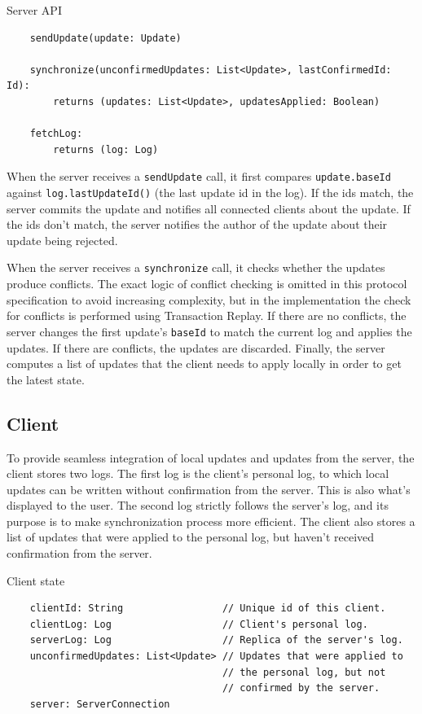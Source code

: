 \documentclass[a4paper, 11pt, oneside]{article}
\theoremstyle{definition}
\begin{document}
\begin{algorithm}
    \caption{Server API}\label{alg:server-api}
    \begin{verbatim}
    sendUpdate(update: Update)

    synchronize(unconfirmedUpdates: List<Update>, lastConfirmedId: Id): 
        returns (updates: List<Update>, updatesApplied: Boolean)

    fetchLog:
        returns (log: Log)
    \end{verbatim}
\end{algorithm}

When the server receives a \verb|sendUpdate| call, it first compares \verb|update.baseId| against \verb|log.lastUpdateId()| (the last update id in the log). If the ids match, the server commits the update and notifies all connected clients about the update. If the ids don't match, the server notifies the author of the update about their update being rejected.

When the server receives a \verb|synchronize| call, it checks whether the updates produce conflicts. The exact logic of conflict checking is omitted in this protocol specification to avoid increasing complexity, but in the implementation the check for conflicts is performed using Transaction Replay. If there are no conflicts, the server changes the first update's \verb|baseId| to match the current log and applies the updates. If there are conflicts, the updates are discarded. Finally, the server computes a list of updates that the client needs to apply locally in order to get the latest state.

\subsection{Client}

To provide seamless integration of local updates and updates from the server, the client stores two logs. The first log is the client's personal log, to which local updates can be written without confirmation from the server. This is also what's displayed to the user. The second log strictly follows the server's log, and its purpose is to make synchronization process more efficient. The client also stores a list of updates that were applied to the personal log, but haven't received confirmation from the server.

\begin{algorithm}
    \caption{Client state}\label{alg:client-state}
    \begin{verbatim}
    clientId: String                 // Unique id of this client.
    clientLog: Log                   // Client's personal log.
    serverLog: Log                   // Replica of the server's log.
    unconfirmedUpdates: List<Update> // Updates that were applied to 
                                     // the personal log, but not
                                     // confirmed by the server.
    server: ServerConnection
    \end{verbatim}
\end{algorithm}
\end{document}

